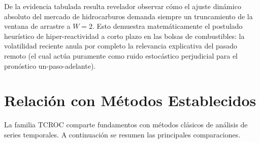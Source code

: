 \begin{table}[H]
\centering
{}
\caption{Evolución del error predictivo porcentual absoluto (MAPE) a lo largo de los anclajes temporales de validación un-paso-adelante para los cuatro macro-indicadores energéticos.}
\label{tab:cv_combustibles_tcroc}
\end{table}

De la evidencia tabulada resulta revelador observar cómo el ajuste dinámico absoluto del mercado de hidrocarburos demanda siempre un truncamiento de la ventana de arrastre a \(W=2\). Esto demuestra matemáticamente el postulado heurístico de hiper-reactividad a corto plazo en las bolsas de combustibles: la volatilidad reciente anula por completo la relevancia explicativa del pasado remoto (el cual actúa puramente como ruido estocástico perjudicial para el pronóstico un-paso-adelante).


\section{Relación con Métodos Establecidos}
\label{sec:tcroc_relacion}

La familia TCROC comparte fundamentos con métodos clásicos de análisis de series temporales. A continuación se resumen las principales comparaciones.

